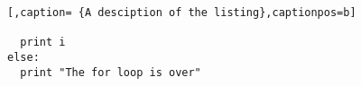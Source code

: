 \usepackage{listings}
\begin{lstlisting}[,caption= {A desciption of the listing},captionpos=b]

  print i
else:
  print "The for loop is over"

\end{lstlisting}
